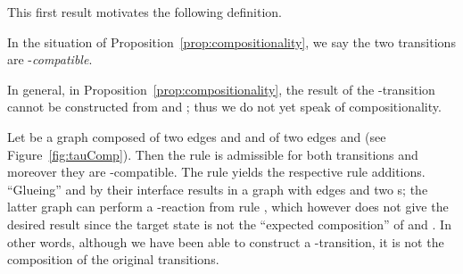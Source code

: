 This first result  motivates the following definition. 
\begin{definition}[-compatible]
  In the situation of Proposition~\ref{prop:compositionality}, 
  we say the two transitions  are -\emph{compatible}. 
\end{definition}

\begin{remark}
  In general, in Proposition~\ref{prop:compositionality}, 
  the result of the -transition cannot be constructed from  and ;
  thus we do not yet speak of compositionality.
\end{remark}

\begin{example}
  Let  be a graph composed of two edges  and  and  of two edges  and   (see Figure~\ref{fig:tauComp}).
  Then the rule  is admissible for both transitions
  and moreover they are -compatible. 
  The rule  yields the respective rule additions.
  ``Glueing''  and  by their interface results in a graph with edges  and two s;
  the latter graph  can perform a -reaction  from rule ,
  which however does not give the desired result
  since the target state is not the ``expected  composition'' of  and . 
  In other words, 
  although we have been able to  construct a -transition,
  it is not the composition of the original transitions.
\end{example}

